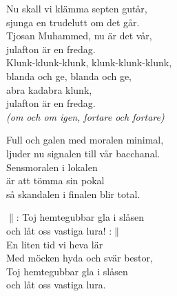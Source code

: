 \documentclass[a6paper, 10pt, twoside]{article}
\begin{document}
\noindent
\begin{center}
\end{center}
\begin{lyrics}
Nu skall vi klämma septen gutår, \\
sjunga en trudelutt om det går. \\
Tjosan Muhammed, nu är det vår, \\
julafton är en fredag. 
\vspace{5pt} \\
Klunk-klunk-klunk, klunk-klunk-klunk, \\
blanda och ge, blanda och ge, \\
abra kadabra klunk, \\
julafton är en fredag. \\\digitalonly{\\}
\textit{(om och om igen, fortare och fortare)}
\end{lyrics}
\begin{center}
\end{center}
\begin{lyrics}
Full och galen med moralen minimal, \\
ljuder nu signalen till vår bacchanal. \\
Sensmoralen i lokalen \\
är att tömma sin pokal \\
så skandalen i finalen blir total.
\end{lyrics}
\begin{center}
\end{center}
\begin{lyrics}
$\|$: Toj hemtegubbar gla i slåsen \\
och låt oss vastiga lura! :$\|$
\vspace{5pt} \\
En liten tid vi heva lär \\
Med möcken hyda och svär bestor, \\
Toj hemtegubbar gla i slåsen \\
och låt oss vastiga lura.
\end{lyrics}
\end{document}
